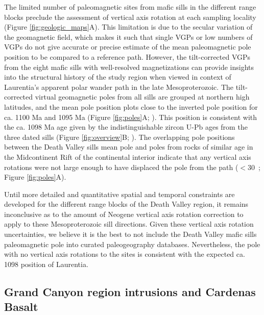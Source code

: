 The limited number of paleomagnetic sites from mafic sills in the different range blocks preclude the assessment of vertical axis rotation at each sampling locality (Figure \ref{fig:geologic_maps}A). This limitation is due to the secular variation of the geomagnetic field, which makes it such that single VGPs or low numbers of VGPs do not give accurate or precise estimate of the mean paleomagnetic pole position to be compared to a reference path. However, the tilt-corrected VGPs from the eight mafic sills with well-resolved magnetizations can provide insights into the structural history of the study region when viewed in context of Laurentia's apparent polar wander path in the late Mesoproterozoic. The tilt-corrected virtual geomagnetic poles from all sills are grouped at northern high latitudes, and the mean pole position plots close to the inverted pole position for ca. 1100 Ma and 1095 Ma (Figure \ref{fig:poles}A; ). This position is consistent with the ca. 1098 Ma age given by the indistinguishable zircon U-Pb ages from the three dated sills (Figure \ref{fig:overview}B; ). The overlapping pole positions between the Death Valley sills mean pole and poles from rocks of similar age in the Midcontinent Rift of the continental interior indicate that any vertical axis rotations were not large enough to have displaced the pole from the path ($<$30\textdegree\ ; Figure \ref{fig:poles}A).

Until more detailed and quantitative spatial and temporal constraints are developed for the different range blocks of the Death Valley region, it remains inconclusive as to the amount of Neogene vertical axis rotation correction to apply to these Mesoproterozoic sill directions. Given these vertical axis rotation uncertainties, we believe it is the best to not include the Death Valley mafic sills paleomagnetic pole into curated paleogeography databases. Nevertheless, the pole with no vertical axis rotations to the sites is consistent with the expected ca. 1098 position of Laurentia.

\subsection*{Grand Canyon region intrusions and Cardenas Basalt}

